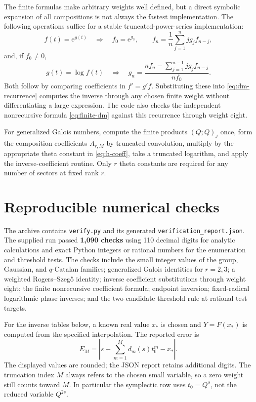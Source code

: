 \documentclass[11pt]{article}
\numberwithin{equation}{section}
\theoremstyle{definition}
\newcommand{\pp}[1]{(Q;Q)_{#1}}
\newcommand{\ee}{\mathrm e}
\begin{document}
The finite formulas make arbitrary weights well defined, but a direct symbolic expansion of all compositions is not always the fastest implementation. The following operations suffice for a stable truncated-power-series implementation:
\begin{equation}\label{eq:seriesexpalgorithm}
 f(t)=\ee^{g(t)}\quad\Longrightarrow\quad
 f_0=\ee^{g_0},\qquad
 f_n=\frac1n\sum_{j=1}^n jg_jf_{n-j},
\end{equation}
and, if $f_0\ne0$,
\begin{equation}\label{eq:serieslogalgorithm}
 g(t)=\log f(t)\quad\Longrightarrow\quad
 g_n=\frac{nf_n-\sum_{j=1}^{n-1}jg_jf_{n-j}}{nf_0}.
\end{equation}
Both follow by comparing coefficients in $f'=g'f$. Substituting these into
\eqref{eq:dm-recurrence} computes the inverse through any chosen finite weight without differentiating a large expression. The code also checks the independent nonrecursive formula \eqref{eq:finite-dm} against this recurrence through weight eight.

For generalized Galois numbers, compute the finite products $\pp{j}$ once, form the composition coefficients $A_{r,M}$ by truncated convolution, multiply by the appropriate theta constant in \eqref{eq:h-coeff}, take a truncated logarithm, and apply the inverse-coefficient routine. Only $r$ theta constants are required for any number of sectors at fixed rank $r$.

\section{Reproducible numerical checks}
\label{sec:numerics}

The archive contains \texttt{verify.py} and its generated
\texttt{verification\_report.json}. The supplied run passed \textbf{1,090 checks} using 110 decimal digits for analytic calculations and exact Python integers or rational numbers for the enumeration and threshold tests. The checks include the small integer values of the group, Gaussian, and $q$-Catalan families; generalized Galois identities for $r=2,3$; a weighted Rogers--Szeg\H{o} identity; inverse coefficient substitutions through weight eight; the finite nonrecursive coefficient formula; endpoint inversion; fixed-radical logarithmic-phase inverses; and the two-candidate threshold rule at rational test targets.

For the inverse tables below, a known real value $x_*$ is chosen and
$Y=F(x_*)$ is computed from the specified interpolation. The reported error is
\begin{equation}\label{eq:tableerror}
 E_M=\left|s+\sum_{m=1}^M d_m(s)t_0^m-x_*\right|.
\end{equation}
The displayed values are rounded; the JSON report retains additional digits. The truncation index $M$ always refers to the chosen small variable, so a zero weight still counts toward $M$. In particular the symplectic row uses $t_0=Q^s$, not the reduced variable $Q^{2s}$.
\end{document}
